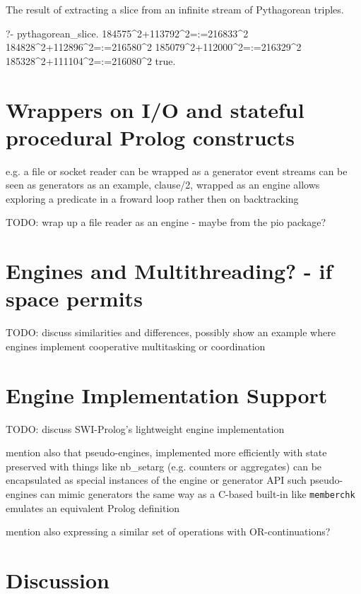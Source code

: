 \documentclass{new_tlp}
\begin{document}
\BX
The result of extracting a slice from an infinite stream of Pythagorean triples.
\begin{codex}
?- pythagorean_slice.
184575^2+113792^2=:=216833^2
184828^2+112896^2=:=216580^2
185079^2+112000^2=:=216329^2
185328^2+111104^2=:=216080^2
true.
\end{codex}
\EX

\section{Wrappers on I/O and stateful procedural Prolog constructs}

\BI
\I e.g. a file or socket reader can be wrapped as a generator
\I event streams can be seen as generators 
\I as an example, clause/2, wrapped as an engine allows exploring a predicate in a froward loop rather then on backtracking
\EI

{\Large TODO: wrap up a file reader as an engine - maybe from the pio package?}

\section{Engines and Multithreading? - if space permits}

{\Large TODO: discuss similarities and differences, possibly show an example where engines implement cooperative multitasking or coordination}

\section{Engine Implementation Support}

{\Large TODO: discuss  SWI-Prolog's lightweight engine implementation}

\BI
\I mention also that pseudo-engines, implemented more efficiently with state
preserved with things like nb\_setarg (e.g. counters or aggregates) can be encapsulated as special instances of the engine or generator API
\I such pseudo-engines can mimic generators the same way as a C-based built-in like {\tt memberchk} emulates an equivalent Prolog definition 

\I mention also expressing a similar set of operations with OR-continuations?
\EI

\section{Discussion}
\end{document}
